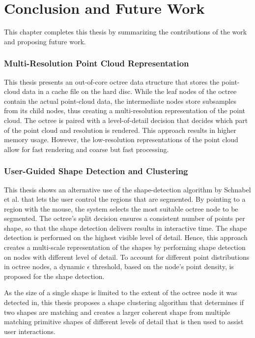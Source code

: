 \chapter{Conclusion and Future Work}
\label{chap:conclusion}


This chapter completes this thesis by summarizing the contributions of the work and proposing future work.

\subsection*{Multi-Resolution Point Cloud Representation}

This thesis presents an out-of-core octree data structure that stores the point-cloud data in a cache file on the hard disc. While the leaf nodes of the octree contain the actual point-cloud data, the intermediate nodes store subsamples from its child nodes, thus creating a multi-resolution representation of the point cloud. The octree is paired with a level-of-detail decision that decides which part of the point cloud and resolution is rendered. This approach results in higher memory usage. However, the low-resolution representations of the point cloud allow for fast rendering and coarse but fast processing. 


\subsection*{User-Guided Shape Detection and Clustering}

This thesis shows an alternative use of the shape-detection algorithm by Schnabel et al. \cite{schnabel-2007-efficient} that lets the user control the regions that are segmented. By pointing to a region with the mouse, the system selects the most suitable octree node to be segmented. The octree's split decision ensures a consistent number of points per shape, so that the shape detection delivers results in interactive time. The shape detection is performed on the highest visible level of detail. Hence, this approach creates a multi-scale representation of the shapes by performing shape detection on nodes with different level of detail. To account for different point distributions in octree nodes, a dynamic $\epsilon$ threshold, based on the node's point density, is proposed for the shape detection. 

\par

As the size of a single shape is limited to the extent of the octree node it was detected in, this thesis proposes a shape clustering algorithm that determines if two shapes are matching and creates a larger coherent shape from multiple matching primitive shapes of different levels of detail that is then used to assist user interactions. 


